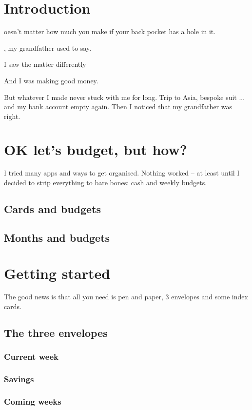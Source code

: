 \documentclass[a5paper,10pt]{book}
\begin{document}
\section{Introduction}
\date
Doesn't matter how much you make if your back pocket has a hole in it.

, my grandfather used to say.

I saw the matter differently 

And I was making good money.

But whatever I made never stuck with me for long. Trip to Asia, bespoke suit ... and my bank account empty again. Then I noticed that my grandfather was right.

\section{OK let's budget, but how?}

I tried many apps and ways to get organised. Nothing worked – at least until I decided to strip everything to bare bones: cash and weekly budgets.

\subsection{Cards and budgets}
\subsection{Months and budgets}

\section{Getting started}

The good news is that all you need is pen and paper, 3 envelopes and some index cards.

\subsection{The three envelopes}

\subsubsection{Current week}

\subsubsection{Savings}

\subsubsection{Coming weeks}
\end{document}
